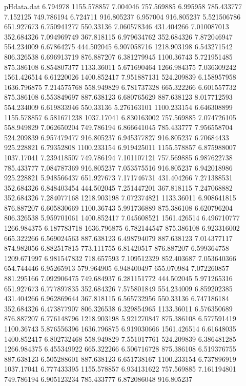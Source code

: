 \begin{filecontents}{pHdata.dat}
6.794978	1155.578857
7.004046	757.569885
6.995958	785.433777
7.152125	749.786194
6.724711	916.805237
6.957004	916.805237
5.521506786	651.927673
6.750941277	550.33136
7.060578346	431.404266
7.010087013	352.684326
7.094969749	367.818115
6.979634762	352.684326
7.872046947	554.234009
6.67864275	444.502045
6.907058716	1218.903198
6.543271542	806.326538
6.696913719	876.887207
6.381279945	1100.36743
5.721951485	875.386108
6.854807377	1133.36011
5.671690464	1266.984375
7.036309242	1561.426514
6.61220026	1400.852417
7.951887131	524.209839
6.158957958	1636.796875
7.214575768	558.949829
6.781737328	665.322266
6.601557732	875.386108
6.553849697	887.638123
6.680765629	887.638123
8.017712593	554.234009
6.619833946	550.33136
5.276163101	1100.233154
6.646308899	1155.578857
6.581671238	1037.17041
6.830163002	757.569885
7.074726105	558.949829
7.062650204	749.786194
6.866641045	785.433777
7.956558704	524.209839
6.957479477	916.805237
6.945377827	916.805237
6.70684433	925.228821
6.79352808	1100.233154
6.919425011	1155.578857
6.875988007	1037.17041
7.239418507	749.786194
7.101107121	757.569885
6.987622738	785.433777
7.084787369	916.805237
7.053575516	916.805237
6.942018986	925.228821
5.948566437	651.927673
7.171746731	431.404266
7.271388531	352.684326
6.848403454	444.502045
7.251447201	367.818115
7.247068882	352.684326
7.284077168	1218.903198
7.072374821	1133.36011
6.908641815	876.887207
6.605830669	1100.36743
5.991736889	875.386108
6.620796204	806.326538
5.959701061	1400.852417
7.045608521	1561.426514
6.496710777	1266.984375
6.187783718	1636.796875
6.782144547	875.386108
6.923316002	665.322266
6.569024563	887.638123
6.498794079	887.638123
7.014377117	874.982056
6.882517815	773.111755
6.81420517	876.887207
6.599364758	1209.671997
6.981547832	718.657593
7.109512329	852.403687
7.053640366	654.744446
6.95265913	579.964905
6.948400497	655.070984
7.072260857	881.295166
7.092906475	749.684937
6.281151772	444.502045
5.971265316	651.927673
6.777897835	352.684326
7.575801849	554.234009
6.859202385	431.404266
6.962869644	367.818115
6.565732956	550.33136
6.747186184	352.684326
6.473877907	806.326538
6.329854965	1133.36011
6.576350689	876.887207
6.776148796	1218.903198
5.921270847	875.386108
6.577591419	1100.36743
5.876556396	1636.796875
6.919030666	1561.426514
6.61648035	1400.852417
6.802732468	558.949829
7.551017761	524.209839
6.386481285	1266.984375
6.455349922	665.322266
6.506716728	875.386108
6.519376755	887.638123
6.505288601	887.638123
6.651738167	1100.233154
6.737896919	1037.17041
6.777433395	1155.578857
6.934131622	757.569885
7.161194801	749.786194
6.905123234	785.433777
6.872086048	916.805237

\end{filecontents}
